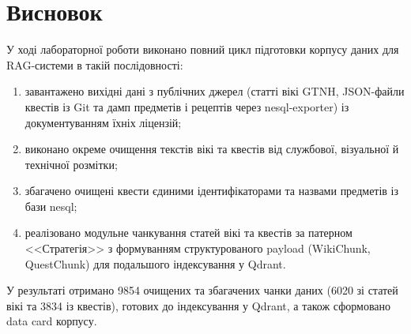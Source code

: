\clearpage
{}
\chapter*{Висновок}
\label{chapter:conclusion}

У ході лабораторної роботи виконано повний цикл підготовки корпусу даних для RAG-системи в такій послідовності:
\begin{enumerate}[wide]
    \item завантажено вихідні дані з публічних джерел (статті вікі GTNH, JSON-файли квестів із Git та дамп предметів і рецептів через nesql-exporter) із документуванням їхніх ліцензій;
    \item виконано окреме очищення текстів вікі та квестів від службової, візуальної й технічної розмітки;
    \item збагачено очищені квести єдиними ідентифікаторами та назвами предметів із бази nesql;
    \item реалізовано модульне чанкування статей вікі та квестів за патерном <<Стратегія>> з формуванням структурованого payload (WikiChunk, QuestChunk) для подальшого індексування у Qdrant.
\end{enumerate}

У результаті отримано 9854 очищених та збагачених чанки даних (6020 зі статей вікі та 3834 із квестів), готових до індексування у Qdrant, а також сформовано data card корпусу.